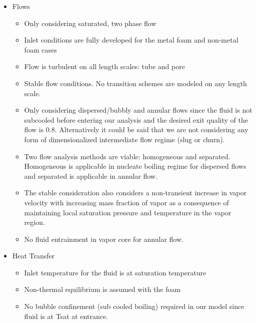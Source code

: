 \documentclass[compileTAMUreport.tex]{subfiles}
\begin{document}
\begin{itemize}
\item Flows
	\begin{itemize}
		\item 	Only considering saturated, two phase flow 
		\item 	Inlet conditions are fully developed for the metal foam and non-metal foam cases
		\item 	Flow is turbulent on all length scales: tube and pore \cite{Incropera}
		\item 	Stable flow conditions. No transition schemes are modeled on any length scale.
		\item 	Only considering dispersed/bubbly and annular flows since the fluid is not subcooled before entering our analysis and the desired exit quality of the flow is 0.8. 
		Alternatively it could be said that we are not considering any form of dimensionalized intermediate flow regime (slug or churn).
		\item	Two flow analysis methods are viable: homogeneous and separated. 
		Homogeneous is applicable in nucleate boiling regime for dispersed flows and separated is applicable in annular flow.
		\item 	The stable consideration also considers a non-transient increase in vapor velocity with increasing mass fraction of vapor as a consequence of maintaining local saturation pressure and temperature in the vapor region.
		\item 	No fluid entrainment in vapor core for annular flow.
	\end{itemize}

\item Heat Transfer
	\begin{itemize}
		\item 	Inlet temperature for the fluid is at saturation temperature
		\item 	Non-thermal equilibrium is assumed with the foam\cite{Xu2011}
		\item 	No bubble confinement  (sub cooled boiling) required in our model since fluid is at Tsat at entrance.
	\end{itemize}
\end{itemize}
\end{document}
